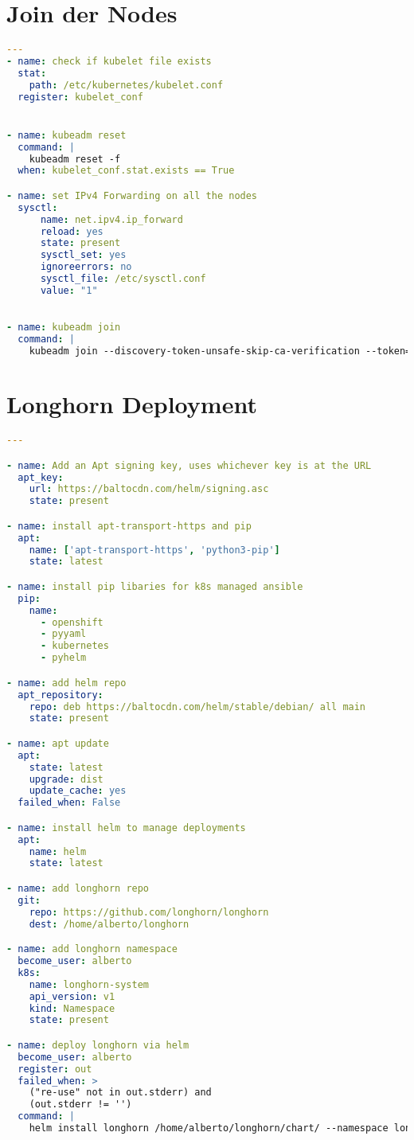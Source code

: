 \section{Join der Nodes}
\hfill \newline
\label{app:join_role}
\begin{lstlisting}[language=yaml]
---
- name: check if kubelet file exists
  stat: 
    path: /etc/kubernetes/kubelet.conf
  register: kubelet_conf


- name: kubeadm reset 
  command: |
    kubeadm reset -f
  when: kubelet_conf.stat.exists == True

- name: set IPv4 Forwarding on all the nodes
  sysctl:
      name: net.ipv4.ip_forward 
      reload: yes
      state: present 
      sysctl_set: yes
      ignoreerrors: no 
      sysctl_file: /etc/sysctl.conf
      value: "1" 
    

- name: kubeadm join
  command: |
    kubeadm join --discovery-token-unsafe-skip-ca-verification --token={{ token }} k8smaster:6443
\end{lstlisting}

\section{Longhorn Deployment}
\hfill \newline
\label{app:longhorn}
\begin{lstlisting}[language=yaml]
---

- name: Add an Apt signing key, uses whichever key is at the URL
  apt_key:
    url: https://baltocdn.com/helm/signing.asc
    state: present

- name: install apt-transport-https and pip
  apt:
    name: ['apt-transport-https', 'python3-pip']
    state: latest

- name: install pip libaries for k8s managed ansible
  pip:
    name:
      - openshift  
      - pyyaml
      - kubernetes
      - pyhelm

- name: add helm repo
  apt_repository:
    repo: deb https://baltocdn.com/helm/stable/debian/ all main
    state: present

- name: apt update
  apt:
    state: latest
    upgrade: dist
    update_cache: yes
  failed_when: False

- name: install helm to manage deployments
  apt:
    name: helm
    state: latest

- name: add longhorn repo
  git:
    repo: https://github.com/longhorn/longhorn
    dest: /home/alberto/longhorn

- name: add longhorn namespace
  become_user: alberto
  k8s:
    name: longhorn-system
    api_version: v1
    kind: Namespace
    state: present

- name: deploy longhorn via helm
  become_user: alberto
  register: out
  failed_when: >
    ("re-use" not in out.stderr) and
    (out.stderr != '')
  command: |
    helm install longhorn /home/alberto/longhorn/chart/ --namespace longhorn-system
\end{lstlisting}